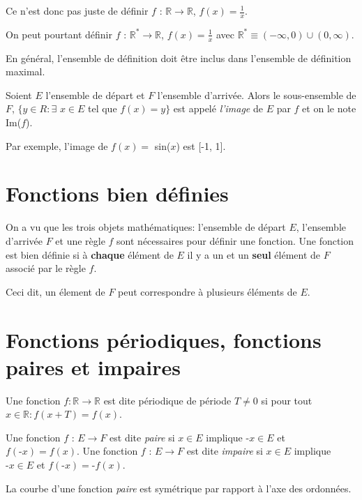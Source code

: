 Ce n'est donc pas juste de définir $f$ : $\mathbb{R} \to \mathbb{R}$, $f(x) = \frac{1}{x}$. 

On peut pourtant définir $f$ : $\mathbb{R}^* \to \mathbb{R}$, $f(x) = \frac{1}{x}$ avec  $\mathbb{R}^* \equiv (-\infty, 0) \cup (0, \infty)$. 

En général, l'ensemble de définition doit être inclus dans l'ensemble de définition maximal.

\begin{boxdef}[Image]
Soient $E$ l'ensemble de départ et $F$ l'ensemble d'arrivée. Alors le sous-ensemble de $F$, $\{y \in R : \exists$  $x \in E$ tel que $f(x) = y\}$ est
appelé \textit{l’image} de $E$ par $f$ et on le note Im($f$). 
\end{boxdef}
Par exemple, l'image de $f(x) =$ sin($x$) est [-1, 1].

\section{Fonctions bien définies}
On a vu que les trois objets mathématiques: l'ensemble de départ $E$, l'ensemble d'arrivée $F$ et une règle $f$ sont nécessaires pour définir une fonction. Une fonction est bien définie si à \textbf{chaque} élément de $E$ il y a un et un \textbf{seul} élément de $F$ associé par le règle $f$. 

Ceci dit, un élement de $F$ peut correspondre à plusieurs éléments de $E$. 

\section{Fonctions périodiques, fonctions paires et impaires}
\begin{boxdef}
Une fonction $f : \mathbb{R} \to \mathbb{R}$ est dite périodique de période
$T \neq 0$ si pour tout $x \in \mathbb{R} : f(x + T) = f(x)$.
\end{boxdef}
\begin{boxdef}
Une fonction $f$ : $E \to F$ est dite \textit{paire} si $x \in E$ implique $\text{-}x \in E$ et $f(\text{-}x) = f(x)$.
Une fonction $f$ : $E \to F$ est dite \textit{impaire} si $x \in E$ implique $\text{-}x \in E$ et $f(\text{-}x) = \text{-}f(x)$.
\end{boxdef}
La courbe d’une fonction \textit{paire} est symétrique par rapport à l’axe des ordonnées.

